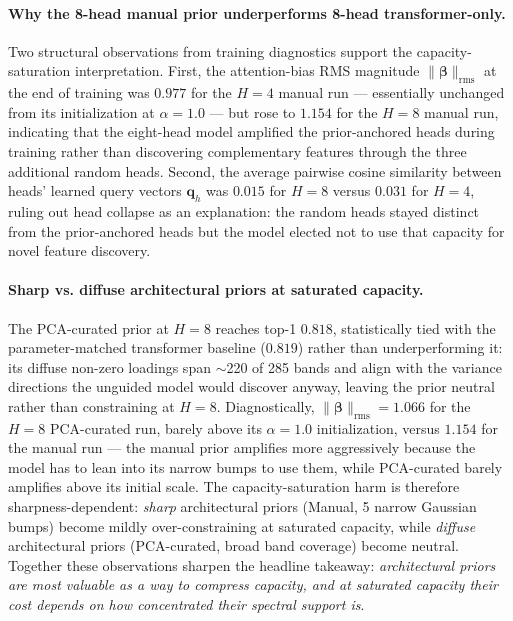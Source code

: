 \documentclass[preprint,12pt]{elsarticle}
\begin{document}
\paragraph{Why the 8-head manual prior underperforms 8-head transformer-only.}
Two structural observations from training diagnostics support the capacity-saturation interpretation.
First, the attention-bias RMS magnitude $\|\bm{\beta}\|_{\text{rms}}$ at the end of training was $0.977$ for the $H = 4$ manual run --- essentially unchanged from its initialization at $\alpha = 1.0$ --- but rose to $1.154$ for the $H = 8$ manual run, indicating that the eight-head model amplified the prior-anchored heads during training rather than discovering complementary features through the three additional random heads.
Second, the average pairwise cosine similarity between heads' learned query vectors $\mathbf{q}_h$ was $0.015$ for $H = 8$ versus $0.031$ for $H = 4$, ruling out head collapse as an explanation: the random heads stayed distinct from the prior-anchored heads but the model elected not to use that capacity for novel feature discovery.

\paragraph{Sharp vs. diffuse architectural priors at saturated capacity.}
The PCA-curated prior at $H = 8$ reaches top-1 $0.818$, statistically tied with the parameter-matched transformer baseline ($0.819$) rather than underperforming it: its diffuse non-zero loadings span $\sim$220 of 285 bands and align with the variance directions the unguided model would discover anyway, leaving the prior neutral rather than constraining at $H = 8$. Diagnostically, $\|\bm{\beta}\|_{\text{rms}} = 1.066$ for the $H = 8$ PCA-curated run, barely above its $\alpha = 1.0$ initialization, versus $1.154$ for the manual run --- the manual prior amplifies more aggressively because the model has to lean into its narrow bumps to use them, while PCA-curated barely amplifies above its initial scale. The capacity-saturation harm is therefore sharpness-dependent: \emph{sharp} architectural priors (Manual, 5 narrow Gaussian bumps) become mildly over-constraining at saturated capacity, while \emph{diffuse} architectural priors (PCA-curated, broad band coverage) become neutral. Together these observations sharpen the headline takeaway: \emph{architectural priors are most valuable as a way to compress capacity, and at saturated capacity their cost depends on how concentrated their spectral support is}.
\end{document}
